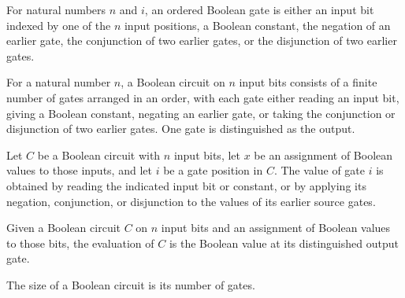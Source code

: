 \begin{definition}
\label{FABL.OrderedBooleanGate}
\leanok
For natural numbers $n$ and $i$, an ordered Boolean gate is either an input bit indexed
by one of the $n$ input positions, a Boolean constant, the negation of an earlier gate,
the conjunction of two earlier gates, or the disjunction of two earlier gates.
\end{definition}

\begin{definition}
\label{FABL.BooleanCircuit}
\leanok
{}
For a natural number $n$, a Boolean circuit on $n$ input bits consists of a finite
number of gates arranged in an order, with each gate either reading an input bit, giving
a Boolean constant, negating an earlier gate, or taking the conjunction or disjunction
of two earlier gates. One gate is distinguished as the output.
\end{definition}

\begin{definition}
\label{FABL.BooleanCircuit.evalGate}
\leanok
{}
Let $C$ be a Boolean circuit with $n$ input bits, let $x$ be an assignment of Boolean
values to those inputs, and let $i$ be a gate position in $C$. The value of gate $i$ is
obtained by reading the indicated input bit or constant, or by applying its negation,
conjunction, or disjunction to the values of its earlier source gates.
\end{definition}

\begin{definition}
\label{FABL.BooleanCircuit.eval}
\leanok
{}
Given a Boolean circuit $C$ on $n$ input bits and an assignment of Boolean values to
those bits, the evaluation of $C$ is the Boolean value at its distinguished output gate.
\end{definition}

\begin{definition}
\label{FABL.BooleanCircuit.size}
\leanok
{}
The size of a Boolean circuit is its number of gates.
\end{definition}

